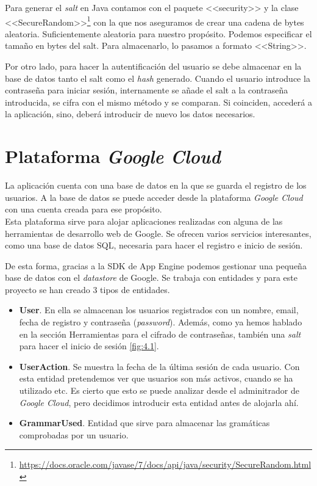 Para generar el \emph{salt} en Java contamos con el paquete <<security>> y la clase <<SecureRandom>>\footnote{\url{https://docs.oracle.com/javase/7/docs/api/java/security/SecureRandom.html}} con la que nos aseguramos de crear una cadena de bytes aleatoria. Suficientemente aleatoria para nuestro propósito. Podemos especificar el tamaño en bytes del salt. Para almacenarlo, lo pasamos a formato <<String>>. 


Por otro lado, para hacer la autentificación del usuario se debe almacenar en la base de datos tanto el salt como el \emph{hash} generado. Cuando el usuario introduce la contraseña para iniciar sesión, internamente se añade el salt a la contraseña introducida, se cifra con el mismo método y se comparan. Si coinciden, accederá a la aplicación, sino, deberá introducir de nuevo los datos necesarios.



\section{Plataforma \emph{Google Cloud}}


La aplicación cuenta con una base de datos en la que se guarda el registro de los usuarios. A la base de datos se puede acceder desde la plataforma \emph{Google Cloud} con una cuenta creada para ese propósito.\\

Esta plataforma sirve para alojar aplicaciones realizadas con alguna de las  herramientas de desarrollo web de Google. Se ofrecen varios servicios interesantes, como una base de datos SQL, necesaria para hacer el registro e inicio de sesión.

De esta forma, gracias a la SDK de App Engine podemos gestionar una pequeña base de datos con el \emph{datastore} de Google. Se trabaja con entidades y para este proyecto se han creado 3 tipos de entidades.

\begin{itemize}
\item \textbf{User}. En ella se almacenan los usuarios registrados con un nombre, email, fecha de registro y contraseña (\emph{password}). Además, como ya hemos hablado en la sección Herramientas para el cifrado de contraseñas, también una \emph{salt} para hacer el inicio de sesión \ref{fig:4.1}.
\item \textbf{UserAction}. Se muestra la fecha de la última sesión de cada usuario. Con esta entidad pretendemos ver que usuarios son más activos, cuando se ha utilizado etc. Es cierto que esto se puede analizar desde el adminitrador de \emph{Google Cloud}, pero decidimos introducir esta entidad antes de alojarla ahí.
\item \textbf{GrammarUsed}. Entidad que sirve para almacenar las gramáticas comprobadas por un usuario. 
\end{itemize}

